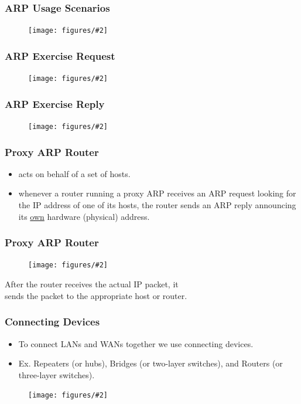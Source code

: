 \documentclass{beamer}
\newcommand{\fig}[2]{
\begin{center}
\begin{figure}
\texttt{[image: figures/\#2]}
\end{figure}
\end{center}
}
\begin{document}
\begin{frame}
\frametitle{\huge ARP Usage Scenarios} 
\fig{0.45}{network_arpscenario2}
\end{frame}



\begin{frame}
\frametitle{\huge ARP Exercise Request} 
\fig{0.4}{network_arprequest}
\end{frame} 


\begin{frame}
\frametitle{\huge ARP Exercise Reply} 
\fig{0.4}{network_arpreply}
\end{frame} 


\begin{frame}
\frametitle{\huge Proxy ARP Router} 
\Large
 \begin{itemize} 
\item <1-> acts on behalf of a set of hosts.
\item <2-> whenever a router running a proxy ARP receives an ARP request looking for the IP address of one of its hosts, the router sends an ARP reply announcing its \underline{own} hardware (physical) address.
\end{itemize}
\end{frame}


   \begin{frame}
\frametitle{\huge Proxy ARP Router} 
\fig{0.45}{network_arpproxy}
After the router receives the actual IP packet, it  \\ sends the packet to the appropriate host or router.
\end{frame}


   \begin{frame}
\frametitle{\huge Connecting Devices} 
\Large
 \begin{itemize} 
\item <1-> To connect LANs and WANs together we use connecting devices.
\item <2-> Ex. Repeaters (or hubs), Bridges (or two-layer switches), and Routers (or three-layer switches).
\end{itemize}
 \fig{0.55}{network_connections}
\end{frame}
\end{document}
